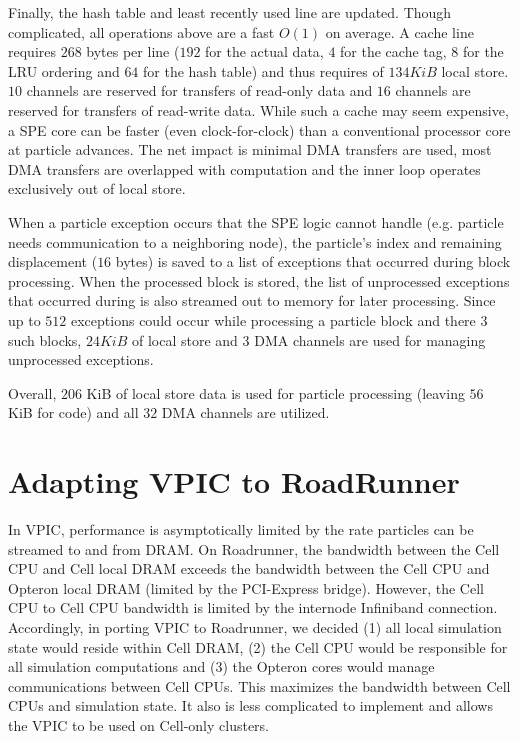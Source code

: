 \documentclass[letter,10pt]{article}
\begin{document}
Finally, the hash table and least recently used line are updated.
Though complicated, all operations above are a fast $O(1)$ on average.
A cache line requires $268$ bytes per line ($192$ for the actual data,
$4$ for the cache tag, $8$ for the LRU ordering and $64$ for the hash
table) and thus requires of $134 KiB$ local store.  $10$ channels are
reserved for transfers of read-only data and $16$ channels are
reserved for transfers of read-write data.  While such a cache may
seem expensive, a SPE core can be faster (even clock-for-clock) than a
conventional processor core at particle advances.  The net impact is
minimal DMA transfers are used, most DMA transfers are overlapped with
computation and the inner loop operates exclusively out of local store.

When a particle exception occurs that the SPE logic cannot handle
(e.g. particle needs communication to a neighboring node), the
particle's index and remaining displacement ($16$ bytes) is saved to a
list of exceptions that occurred during block processing.  When
the processed block is stored, the list of unprocessed
exceptions that occurred during is also streamed out to memory for
later processing.  Since up to $512$ exceptions could occur while
processing a particle block and there $3$ such blocks, $24
KiB$ of local store and $3$ DMA channels are used for managing
unprocessed exceptions.

Overall, $206$ KiB of local store data is used for particle
processing (leaving $56$ KiB for code) and all $32$ DMA channels
are utilized.


\section*{Adapting VPIC to RoadRunner}

In VPIC, performance is asymptotically limited by the rate particles
can be streamed to and from DRAM.  On Roadrunner, the bandwidth
between the Cell CPU and Cell local DRAM exceeds the bandwidth between
the Cell CPU and Opteron local DRAM (limited by the PCI-Express
bridge).  However, the Cell CPU to Cell CPU bandwidth is limited by
the internode Infiniband connection.  Accordingly, in porting VPIC to
Roadrunner, we decided (1) all local simulation state would reside
within Cell DRAM, (2) the Cell CPU would be responsible for all
simulation computations and (3) the Opteron cores would manage
communications between Cell CPUs.  This maximizes the bandwidth
between Cell CPUs and simulation state.  It also is less complicated
to implement and allows the VPIC to be used on Cell-only clusters.
\end{document}
